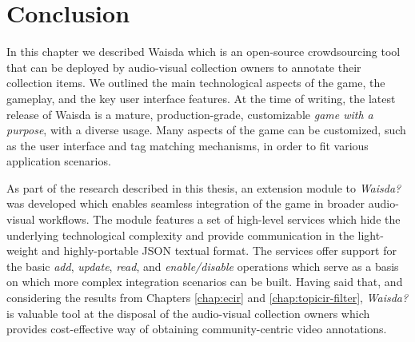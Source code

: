 \section{Conclusion}
In this chapter we described Waisda which is an open-source crowdsourcing tool that can be deployed by audio-visual collection owners to annotate their collection items. We outlined the main technological aspects of the game, the gameplay, and the key user interface features. At the time of writing, the latest release of Waisda is a mature, production-grade, customizable \textit{game with a purpose}, with a diverse usage. Many aspects of the game can be customized, such as the user interface and tag matching mechanisms, in order to fit various application scenarios. 

As part of the research described in this thesis, an extension module to \textit{Waisda?} was developed which enables seamless integration of the game in broader audio-visual workflows. The module features a set of high-level services which hide the underlying technological complexity  and provide communication in the light-weight and highly-portable JSON textual format. The services offer support for the basic \textit{add}, \textit{update}, \textit{read}, and \textit{enable/disable} operations which serve as a basis on which more complex integration scenarios can be built. Having said that, and considering the results from Chapters \ref{chap:ecir} and \ref{chap:topicir-filter}, \textit{Waisda?} is valuable tool at the disposal of the audio-visual collection owners which provides cost-effective way of obtaining community-centric video annotations.

